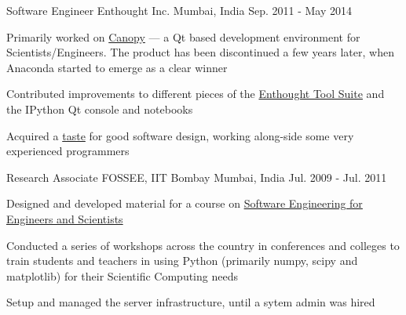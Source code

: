 \begin{cventries}
  \cventry
    {Software Engineer} %
    {Enthought Inc. } %
    {Mumbai, India} %
    {Sep. 2011 - May 2014} %
    {
      \begin{cvitems} %
        \item {Primarily worked on \href{https://web.archive.org/web/20170621202502/https://www.enthought.com/products/canopy/}{Canopy} --- a Qt based development environment for Scientists/Engineers. The product has been discontinued a few years later, when Anaconda started to emerge as a clear winner}
        \item {Contributed improvements to different pieces of the \href{https://docs.enthought.com/ets/}{Enthought Tool Suite} and the IPython Qt console and notebooks}
        \item {Acquired a \href{https://rawgit.com/punchagan/340e1350fdfc766c6599/raw/ca1f5fe9bfc1cc503cd8a524e350bd29e8f5f33d/month-with-martin.html}{taste} for good software design, working along-side some very experienced programmers}
      \end{cvitems}
    }

  \cventry
    {Research Associate} %
    {FOSSEE, IIT Bombay } %
    {Mumbai, India} %
    {Jul. 2009 - Jul. 2011} %
    {
      \begin{cvitems} %
        \item {Designed and developed material for a course on \href{https://github.com/FOSSEE/sees}{Software Engineering for Engineers and Scientists}}
        \item {Conducted a series of workshops across the country in conferences and colleges to train students and teachers in using Python (primarily numpy, scipy and matplotlib) for their Scientific Computing needs}
        \item {Setup and managed the server infrastructure, until a sytem admin was hired}
      \end{cvitems}
    }

\end{cventries}
